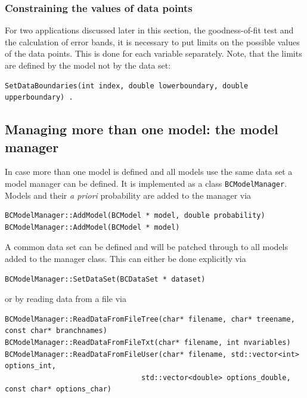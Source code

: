 \documentclass[11pt, a4paper]{article}
\begin{document}
\subsubsection{Constraining the values of data points}

For two applications discussed later in this section, the goodness-of-fit test and the calculation 
of error bands, it is necessary to put limits on the possible values of the data points. This is 
done for each variable separately. Note, that the limits are defined by the model not by the data 
set: 
%
\begin{verbatim}
SetDataBoundaries(int index, double lowerboundary, double upperboundary) . 
\end{verbatim}


\subsection{Managing more than one model: the model manager} 

In case more than one model is defined and all models use the same
data set a model manager can be defined. It is implemented as a class
\verb|BCModelManager|. Models and their {\it a priori} probability are
added to the manager via
% 
\begin{verbatim}
BCModelManager::AddModel(BCModel * model, double probability)
BCModelManager::AddModel(BCModel * model)
\end{verbatim} 

\noindent 
A common data set can be defined and will be patched through to all
models added to the manager class. This can either be done explicitly
via
%
\begin{verbatim}
BCModelManager::SetDataSet(BCDataSet * dataset) 
\end{verbatim} 

\noindent 
or by reading data from a file via 
%
\begin{small}
\begin{verbatim}
BCModelManager::ReadDataFromFileTree(char* filename, char* treename, const char* branchnames)
BCModelManager::ReadDataFromFileTxt(char* filename, int nvariables)
BCModelManager::ReadDataFromFileUser(char* filename, std::vector<int> options_int,
                                std::vector<double> options_double, const char* options_char)
\end{verbatim} 
\end{small} 
\end{document}
